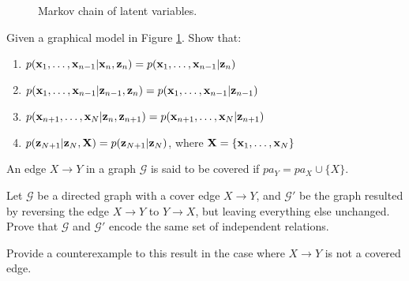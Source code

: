 \documentclass{amsmlaj}
\begin{document}
\begin{problem}
\begin{figure}[H]
\centering
{}
\caption{Markov chain of latent variables.}
\label{fig:hmm}
\end{figure}
Given a graphical model in Figure \ref{fig:hmm}. Show that:
\begin{enumerate}
\item $p(\bm{\mathbf{x}}_1,\dots,\bm{\mathbf{x}}_{n-1}|\bm{\mathbf{x}}_n, \bm{\mathbf{z}}_n) = p(\bm{\mathbf{x}}_1,\dots,\bm{\mathbf{x}}_{n-1}|\bm{\mathbf{z}}_n)$
\item $p(\bm{\mathbf{x}}_1,\dots,\bm{\mathbf{x}}_{n-1}|\bm{\mathbf{z}}_{n-1}, \bm{\mathbf{z}}_n) = p(\bm{\mathbf{x}}_1,\dots,\bm{\mathbf{x}}_{n-1}|\bm{\mathbf{z}}_{n-1})$
\item $p(\bm{\mathbf{x}}_{n+1}, \dots, \bm{\mathbf{x}}_N | \bm{\mathbf{z}}_n,\bm{\mathbf{z}}_{n+1}) = p(\bm{\mathbf{x}}_{n+1}, \dots, \bm{\mathbf{x}}_N | \bm{\mathbf{z}}_{n+1})$
\item $p(\bm{\mathbf{z}}_{N+1}|\bm{\mathbf{z}}_N,\bm{\mathbf{X}}) = p(\bm{\mathbf{z}}_{N+1}|\bm{\mathbf{z}}_N)$, where $\bm{\mathbf{X}} = \{\bm{\mathbf{x}}_1, \dots,\bm{\mathbf{x}}_N\}$
\end{enumerate}

\end{problem}

\begin{problem}
An edge $X \rightarrow Y$ in a graph $\mathcal{G}$ is said to be covered if $pa_Y = pa_X \cup \{X\}$.
\begin{modenumerate}
\item Let $\mathcal{G}$ be a directed graph with a cover edge $X \rightarrow Y$, and $\mathcal{G}'$ be the graph resulted by reversing the edge $X\rightarrow Y$ to $Y\rightarrow X$, but leaving everything else unchanged. Prove that $\mathcal{G}$ and $\mathcal{G}'$ encode the same set of independent relations.
\item Provide a counterexample to this result in the case where $X \rightarrow Y$ is not a covered edge.
\end{modenumerate}
\end{problem}
\end{document}
